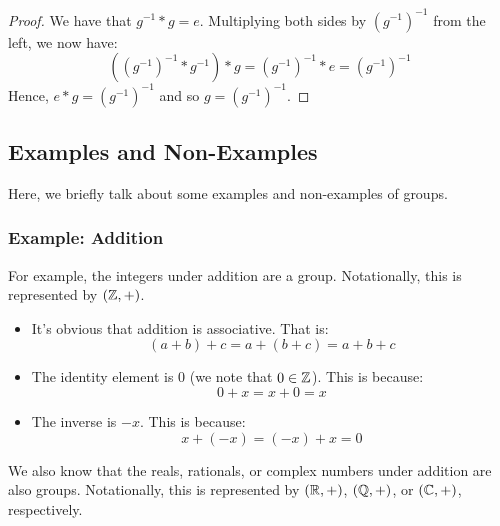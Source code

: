 \documentclass[letterpaper]{article}
\begin{document}
\begin{mdframed}
    \begin{proof}
        We have that $g^{-1} * g = e$. Multiplying both sides by $(g^{-1})^{-1}$ from the left, we now have: 
        \[((g^{-1})^{-1} * g^{-1}) * g = (g^{-1})^{-1} * e = (g^{-1})^{-1}\]
        Hence, $e * g = (g^{-1})^{-1}$ and so $g = (g^{-1})^{-1}$.     
    \end{proof}
\end{mdframed}

\subsection{Examples and Non-Examples}
Here, we briefly talk about some examples and non-examples of groups. 
\subsubsection{Example: Addition}
For example, the integers under addition are a group. Notationally, this is represented by $(\mathbb{Z}, +)$. 
\begin{itemize}
    \item It's obvious that addition is associative. That is:
    \[(a + b) + c = a + (b + c) = a + b + c\]

    \item The identity element is 0 (we note that $0 \in \mathbb{Z}$). This is because:
    \[0 + x = x + 0 = x\]

    \item The inverse is $-x$. This is because:
    \[x + (-x) = (-x) + x = 0\]
\end{itemize}
We also know that the reals, rationals, or complex numbers under addition are also groups. Notationally, this is represented by $(\mathbb{R}, +)$, $(\mathbb{Q}, +)$, or $(\mathbb{C}, +)$, respectively. 
\end{document}
